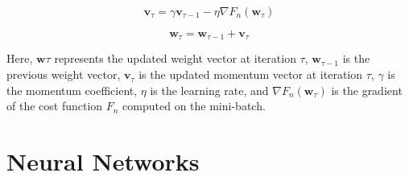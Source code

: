 \documentclass[a4paper, UKenglish, 11pt]{uiomaster}
\begin{document}
\begin{equation}
\textbf{v}_{\tau} = \gamma\textbf{v}_{\tau-1} - \eta\nabla F_n(\textbf{w}_{\tau})
\end{equation}

\begin{equation}
\textbf{w}_{\tau} = \textbf{w}_{\tau-1} + \textbf{v}_{\tau}
\end{equation}

Here, $\textbf{w}{\tau}$ represents the updated weight vector at iteration $\tau$, $\textbf{w}_{\tau-1}$ is the previous weight vector, $\textbf{v}_{\tau}$ is the updated momentum vector at iteration $\tau$, $\gamma$ is the momentum coefficient, $\eta$ is the learning rate, and $\nabla F_n(\textbf{w}_{\tau})$ is the gradient of the cost function $F_n$ computed on the mini-batch.



%
%
%
%




\section{Neural Networks}

\end{document}
